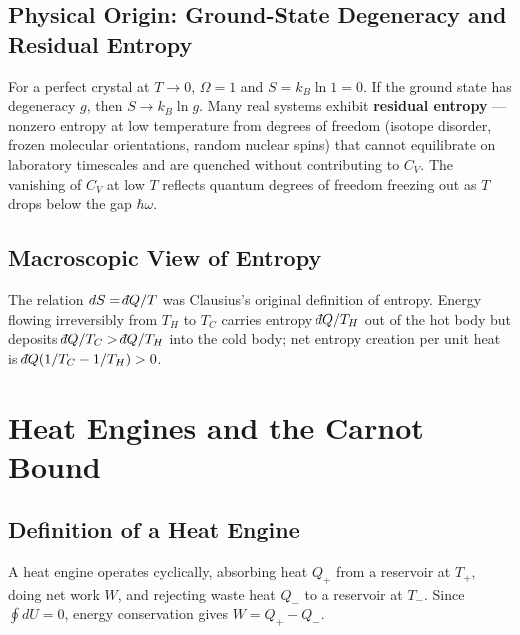 \subsection{Physical Origin: Ground-State Degeneracy and Residual Entropy}

For a perfect crystal at $T \to 0$, $\Omega = 1$ and $S = k_B \ln 1 = 0$. If the ground state has degeneracy $g$, then $S \to k_B \ln g$. Many real systems exhibit \textbf{residual entropy} --- nonzero entropy at low temperature from degrees of freedom (isotope disorder, frozen molecular orientations, random nuclear spins) that cannot equilibrate on laboratory timescales and are quenched without contributing to $C_V$. The vanishing of $C_V$ at low $T$ reflects quantum degrees of freedom freezing out as $T$ drops below the gap $\hbar\omega$.

\subsection{Macroscopic View of Entropy}

The relation $dS = \dbar Q / T$ was Clausius's original definition of entropy. Energy flowing irreversibly from $T_H$ to $T_C$ carries entropy $\dbar Q / T_H$ out of the hot body but deposits $\dbar Q / T_C > \dbar Q / T_H$ into the cold body; net entropy creation per unit heat is $\dbar Q(1/T_C - 1/T_H) > 0$.

\section{Heat Engines and the Carnot Bound}
\label{sec:carnot}

\subsection{Definition of a Heat Engine}

\begin{definition}
A heat engine operates cyclically, absorbing heat $Q_+$ from a reservoir at $T_+$, doing net work $W$, and rejecting waste heat $Q_-$ to a reservoir at $T_-$. Since $\oint dU = 0$, energy conservation gives $W = Q_+ - Q_-$.
\end{definition}

